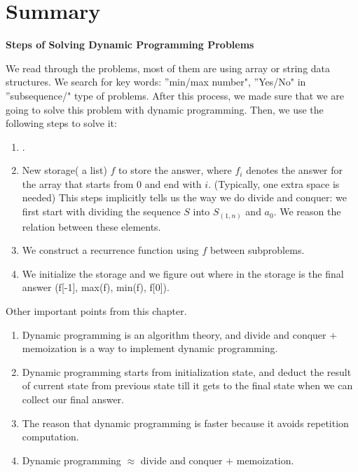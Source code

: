 \documentclass[../main.tex]{subfiles}
\begin{document}
\section{Summary}
\textbf{Steps of Solving Dynamic Programming Problems}

We read through the problems, most of them are using array or string data structures. We search for key words: ''min/max number", ''Yes/No" in ''subsequence/" type of problems. After this process, we made sure that we are going to solve this problem with dynamic programming. Then, we use the following steps to solve it:
\begin{enumerate}
    \item . 
    \item New storage( a list) $f$ to store the answer, where $f_i$ denotes the answer for the array that starts from $0$ and end with $i$. (Typically, one extra space is needed) This steps implicitly tells us the way we do divide and conquer:  we first start with dividing the sequence $S$ into $S_{(1,n)}$ and $a_0$. We reason the relation between these elements.  
    \item We construct a recurrence function using $f$ between subproblems. 
    \item We initialize the storage and we figure out where in the storage is the final answer (f[-1], max(f), min(f), f[0]). 
\end{enumerate}
Other important points from this chapter. 
\begin{enumerate}
    \item Dynamic programming is an algorithm theory, and divide and conquer $+$ memoization is a way to implement dynamic programming.
    \item Dynamic programming starts from initialization state, and deduct the result of current state from previous state till it gets to the final state when we can collect our final answer. 
    \item The reason that dynamic programming is faster because it avoids repetition computation.
    \item Dynamic programming $\approx$ divide and conquer $+$ memoization.
\end{enumerate}
\end{document}
